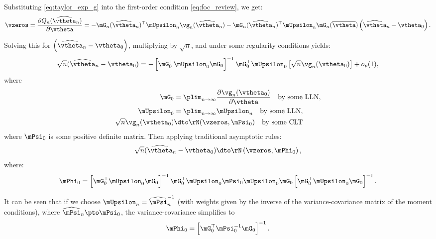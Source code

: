 Substituting \eqref{eq:taylor_exp_g} into the first-order condition \eqref{eq:foc_review}, we get:
\begin{equation*}
  \vzeros = \frac{\partial Q_n(\widehat{\vtheta}_n)}{\partial \vtheta} = - \mG_n(\widehat{\vtheta}_n)^\top\mUpsilon_n\vg_n(\widehat{\vtheta}_n) - \mG_n(\widehat{\vtheta}_n)^\top\mUpsilon_n\mG_n(\overline{\vtheta})\left(\widehat{\vtheta}_n - \vtheta_0\right).
\end{equation*}

Solving this for $\left(\widehat{\vtheta}_n - \vtheta_0\right)$, multiplying by $\sqrt{n}$, and under some regularity conditions yields:
\begin{equation*}
\sqrt{n}(\widehat{\vtheta}_n - \vtheta_0) = - \left[\mG^\top_0\mUpsilon_0\mG_0\right]^{-1}\mG^\top_0\mUpsilon_0\left[\sqrt{n}\vg_n(\vtheta_0)\right] + o_p(1),
\end{equation*}
%
where
\begin{equation}\label{eq:asymptotic_distr_moment} 
\begin{aligned}
\mG_0 & = \plim_{n\to\infty}\frac{\partial \vg_n(\vtheta_0)}{\partial \vtheta} \quad \mbox{by some LLN},  \\
\mUpsilon_0 & = \plim_{n\to\infty}\mUpsilon_n\quad \mbox{by some LLN}, \\ 
\sqrt{n}\vg_n(\vtheta_0)& \dto  \rN(\vzeros, \mPsi_0) \quad \mbox{by some CLT} 
\end{aligned}
\end{equation}
%
where $\mPsi_0$ is some positive definite matrix. Then applying traditional asymptotic rules:
\begin{equation*}
\sqrt{n}(\widehat{\vtheta}_n - \vtheta_0)\dto \rN\left(\vzeros, \mPhi_0\right),
\end{equation*}
%
where:
\begin{equation*}
\mPhi_0 = \left[\mG^\top_0\mUpsilon_0\mG_0\right]^{-1}\mG^\top_0\mUpsilon_0\mPsi_0\mUpsilon_0\mG_0\left[\mG^\top_0\mUpsilon_0\mG_0\right]^{-1}. 
\end{equation*}

It can be seen that if we choose $\mUpsilon_n = \widehat{\mPsi}^{-1}_n$ (with weights given by the inverse of the variance-covariance matrix of the moment conditions), where $\widehat{\mPsi}_n\pto \mPsi_0$, the variance-covariance simplifies to
\begin{equation*}
\mPhi_0 = \left[\mG^\top_0\mPsi^{-1}_0\mG_0\right]^{-1}.
\end{equation*}

